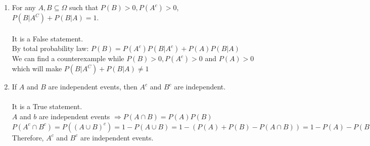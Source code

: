 \documentclass[a4paper]{article}
\theoremstyle{definition}
\newenvironment{soln}{
	\leavevmode\color{blue}\ignorespaces
}{}
\begin{document}
\begin{enumerate}
		\item For any $A, B\subseteq\Omega$ such that $P(B) > 0, P(A^c) > 0$,
		$P(B|A^C) + P(B|A) = 1$.\\ 
		\begin{soln}\\
		It is a False statement. \\
		By total probability law: $P(B) = P(A^c)P(B|A^c) + P(A)P(B|A) $\\
		We can find a counterexample while $P(B) > 0, P(A^c) > 0$ and $P(A) > 0$ which will make $P(B|A^C) + P(B|A) \neq 1$\\
		\end{soln}
		
		\item If $A$ and $B$ are independent events, then $A^{c}$ and $B^{c}$ are independent.\\
		\begin{soln}\\
			It is a True statement. \\
		$A$ and $b$ are independent events $\Rightarrow P(A \cap B) = P(A)P(B)$\\
		$P(A^c \cap B^c) = P((A \cup B)^c) = 1 - P(A \cup B) = 1 - (P(A)+P(B)- P(A \cap B)) = 1 - P(A) - P(B) + P(A)P(B) = (1-P(A))(1-P(B)) = P(A^c)P(B^c)$\\
		Therefore, $A^c$ and $B^c$ are independent events.
		\end{soln}
		
	\end{enumerate}
	
\end{document}
